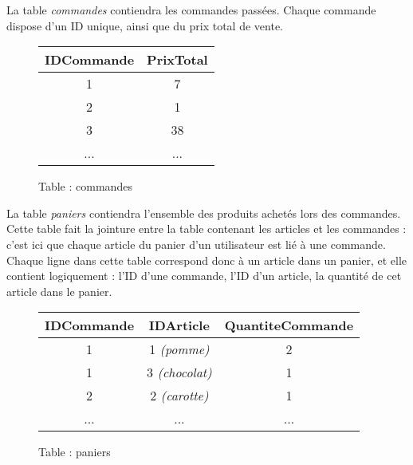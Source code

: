 \bigskip

\noindent La table \textit{commandes} contiendra les commandes passées.
Chaque commande dispose d'un ID unique, ainsi que du prix total de vente.

\medskip

\begin{figure}[h!]
\begin{center}
\begin{tabular}{| c | c |}
\hline
\textbf{IDCommande} & \textbf{PrixTotal} \\
\hline
1 & 7 \\
\hline
2 & 1 \\
\hline
3 & 38 \\
\hline
... & ... \\
\hline
\end{tabular}
\end{center}
\caption{Table : commandes}
\end{figure}

\bigskip

\noindent La table \textit{paniers} contiendra l'ensemble des produits achetés lors des commandes.
Cette table fait la jointure entre la table contenant les articles et les commandes : c'est ici que chaque article du panier d'un utilisateur est lié à une commande.
Chaque ligne dans cette table correspond donc à un article dans un panier, et elle contient logiquement : l'ID d'une commande, l'ID d'un article, la quantité de cet article dans le panier.

\medskip

\begin{figure}[h!]
\begin{center}
\begin{tabular}{| c | c | c |}
\hline
\textbf{IDCommande} & \textbf{IDArticle} & \textbf{QuantiteCommande} \\
\hline
1 & 1 \textit{(pomme)} & 2 \\
\hline
1 & 3 \textit{(chocolat)} & 1 \\
\hline
2 & 2 \textit{(carotte)} & 1 \\
\hline
... & ... & ... \\
\hline
\end{tabular}
\end{center}
\caption{Table : paniers}
\end{figure}
